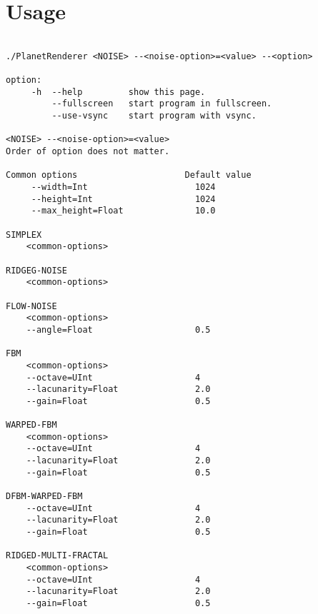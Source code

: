 \section*{Usage}
\label{annexe:usage}

\begin{center}
\lstset{language=sh}
\begin{lstlisting}[basicstyle=\small]

./PlanetRenderer <NOISE> --<noise-option>=<value> --<option>

option:
	 -h  --help         show this page.
 	     --fullscreen   start program in fullscreen.
 	     --use-vsync    start program with vsync.
 	
<NOISE> --<noise-option>=<value>
Order of option does not matter.

Common options                     Default value
	 --width=Int                     1024
	 --height=Int                    1024
	 --max_height=Float              10.0

SIMPLEX
	<common-options>

RIDGEG-NOISE
	<common-options>

FLOW-NOISE
	<common-options>
	--angle=Float                    0.5

FBM
	<common-options> 
	--octave=UInt                    4
	--lacunarity=Float               2.0 
	--gain=Float                     0.5

WARPED-FBM 
	<common-options> 
	--octave=UInt                    4
	--lacunarity=Float               2.0
	--gain=Float                     0.5

DFBM-WARPED-FBM 
	--octave=UInt                    4
	--lacunarity=Float               2.0
	--gain=Float                     0.5

RIDGED-MULTI-FRACTAL 
	<common-options> 
	--octave=UInt                    4
	--lacunarity=Float               2.0
	--gain=Float                     0.5

\end{lstlisting}
\end{center}